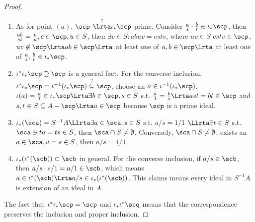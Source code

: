 \begin{proof}
\begin{enumerate}[label=(\alph*)]
\item 
 As for point $(a)$, $\scp$  $\overset{?}{\Lrta}\iota_*\scp$ prime. Consider $\frac{a}{s}\cdot \frac{b}{t}\in \iota_*\scp$, then $\frac{ab}{st}=\frac{c}{u},c\in\scp, u\in S$, then $\exists v\in S:abuv=cstv$, where $uv\in S$ $cstv\in\scp$, $uv\not\in \scp\Lrta ab\in\scp\Lrta$ at least one of $a, b\in\scp\Lrta$ at least one of $\frac{a}{s},\frac{b}{t}\in \iota_*\scp$.
\item 
 $\iota^*\iota_*\scp\supseteq\scp$ is a general fact.
 For the converse inclusion, $\iota^*\iota_*\scp=\iota^{-1}(\iota_*\scp)\overset{?}{\subseteq}\scp$, choose an $a\in \iota^{-1}(\iota_*\scp)$. $\iota(a)=\frac{a}{1}\in\iota_*\scp\Lrta\exists b\in \scp, s\in S$ s.t. $\frac{a}{1}=\frac{b}{s}\Lrta ast=bt\in \scp$ and $s,t \in S\subseteq {A}-\scp\Lrta a\in \scp$ because $\scp$ is a prime ideal.
\item
 $\iota_*(\sca)=S^{-1}{A}\Llrta \exists a\in \sca, s\in S$ s.t. $a/s=1/1$
$\Llrta\exists t\in S$ s.t. $\sca\ni ta=ts\in S$, then $\sca\cap S\neq\emptyset$. Conversely, $\sca\cap S\neq \emptyset$, exists an $a\in \sca, a=s\in S$, then $a/s=1/1$. 
\item 
$\iota_*(\iota^*(\scb))\subset \scb$ in general. For the converse inclusion, if $a/s\in \scb$, then $a/s\cdot s/1=a/1\in\scb$, which means $a\in \iota^{*}(\scb)\Lrta a/s\in \iota_{*}(\iota^*(\scb))$. This claims means every ideal in $S^{-1}{A}$ is extension of an ideal in ${A}$. 
\end{enumerate}
The fact that $\iota^*\iota_*\scp=\scp$ and $\iota_*\iota^*\scq$ means that the correspondence preserves the inclusion and proper inclusion.
\end{proof}

